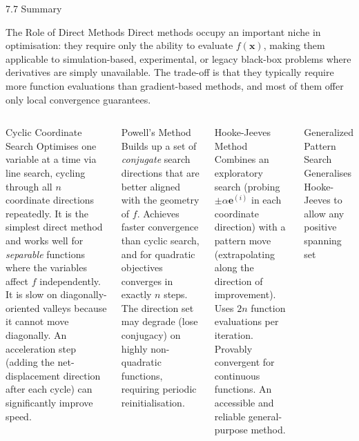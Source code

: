 \documentclass[aspectratio=169,10pt]{beamer}
\begin{document}
\begin{frame}[allowframebreaks]{7.7 Summary}
  \begin{block}{The Role of Direct Methods}
    Direct methods occupy an important niche in optimisation:
    they require only the ability to evaluate $f(\mathbf{x})$, making
    them applicable to simulation-based, experimental, or legacy
    black-box problems where derivatives are simply unavailable.
    The trade-off is that they typically require more function
    evaluations than gradient-based methods, and most of them offer
    only local convergence guarantees.
  \end{block}

  \begin{columns}[T]
      \begin{block}{Cyclic Coordinate Search}
        Optimises one variable at a time via line search, cycling
        through all $n$ coordinate directions repeatedly.  It is the
        simplest direct method and works well for \emph{separable}
        functions where the variables affect $f$ independently.  It is
        slow on diagonally-oriented valleys because it cannot move
        diagonally.  An acceleration step (adding the net-displacement
        direction after each cycle) can significantly improve speed.
      \end{block}
      \begin{block}{Powell's Method}
        Builds up a set of \emph{conjugate} search directions that are
        better aligned with the geometry of $f$.  Achieves faster
        convergence than cyclic search, and for quadratic objectives
        converges in exactly $n$ steps.  The direction set may
        degrade (lose conjugacy) on highly non-quadratic functions,
        requiring periodic reinitialisation.
      \end{block}
      \begin{block}{Hooke-Jeeves Method}
        Combines an exploratory search (probing $\pm\alpha\mathbf{e}^{(i)}$
        in each coordinate direction) with a pattern move (extrapolating
        along the direction of improvement).  Uses $2n$ function
        evaluations per iteration.  Provably convergent for continuous
        functions.  An accessible and reliable general-purpose method.
      \end{block}
      \begin{block}{Generalized Pattern Search}
        Generalises Hooke-Jeeves to allow any positive spanning set

\end{block}
\end{columns}
\end{frame}
\end{document}
